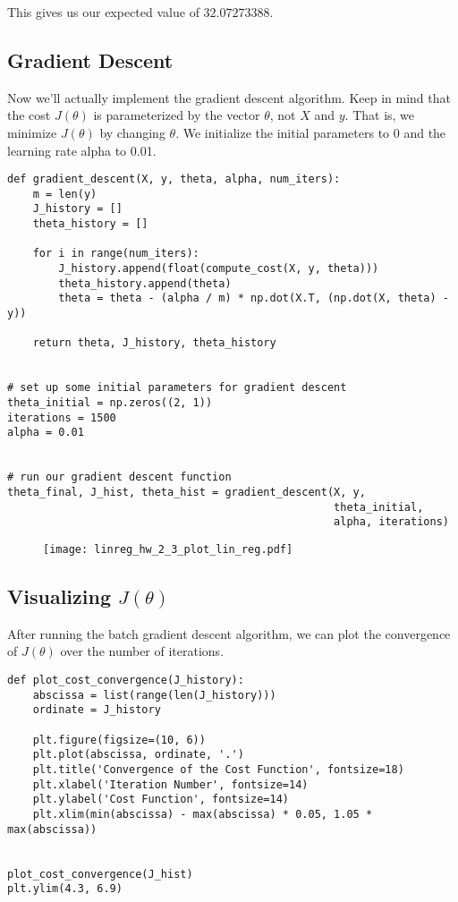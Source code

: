 This gives us our expected value of $32.07273388$.

\subsection*{Gradient Descent}
Now we'll actually implement the gradient descent algorithm. Keep in mind that the cost $J(\theta)$ is parameterized by the vector $\theta$, not $X$ and $y$. That is, we minimize $J(\theta)$ by changing $\theta$. We initialize the initial parameters to 0 and the learning rate alpha to 0.01.

\begin{verbatim}
def gradient_descent(X, y, theta, alpha, num_iters):
    m = len(y)
    J_history = []
    theta_history = []
    
    for i in range(num_iters):
        J_history.append(float(compute_cost(X, y, theta)))
        theta_history.append(theta)
        theta = theta - (alpha / m) * np.dot(X.T, (np.dot(X, theta) - y))
    
    return theta, J_history, theta_history


# set up some initial parameters for gradient descent
theta_initial = np.zeros((2, 1))
iterations = 1500
alpha = 0.01


# run our gradient descent function
theta_final, J_hist, theta_hist = gradient_descent(X, y, 
                                                   theta_initial, 
                                                   alpha, iterations)

\end{verbatim}


\begin{figure}[h] %
	\centering
	\graphicspath{{./Figures/}} %
	\texttt{[image: linreg\_hw\_2\_3\_plot\_lin\_reg.pdf]} 
	\label{linreg_hw_2_3_plot_lin_reg.pdf}
\end{figure}


\subsection*{Visualizing $J\left(\theta\right)$}
After running the batch gradient descent algorithm, we can plot the convergence of $J\left(\theta\right)$ over the number of iterations.
\begin{verbatim}
def plot_cost_convergence(J_history):
    abscissa = list(range(len(J_history)))
    ordinate = J_history

    plt.figure(figsize=(10, 6))
    plt.plot(abscissa, ordinate, '.')
    plt.title('Convergence of the Cost Function', fontsize=18)
    plt.xlabel('Iteration Number', fontsize=14)
    plt.ylabel('Cost Function', fontsize=14)
    plt.xlim(min(abscissa) - max(abscissa) * 0.05, 1.05 * max(abscissa))


plot_cost_convergence(J_hist)
plt.ylim(4.3, 6.9)
\end{verbatim}

